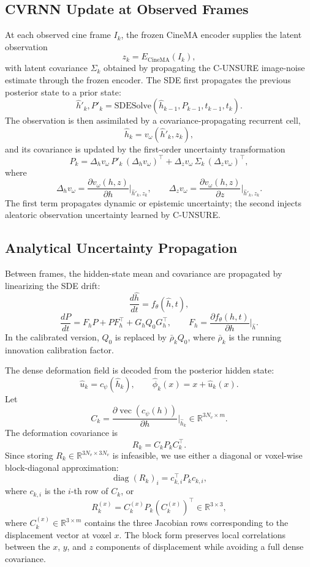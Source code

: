 \subsection{CVRNN Update at Observed Frames}
\label{sec:cvgruu_update_clarified}

At each observed cine frame $I_k$, the frozen CineMA encoder supplies
the latent observation
\[
    z_k = E_{\mathrm{CineMA}}(I_k),
\]
with latent covariance $\Sigma_k$ obtained by propagating the
C-UNSURE image-noise estimate through the frozen encoder. The SDE first
propagates the previous posterior state to a prior state:
\[
    \hat h'_k, P'_k =
    \mathrm{SDESolve}(\hat h_{k-1},P_{k-1},t_{k-1},t_k).
\]
The observation is then assimilated by a covariance-propagating recurrent
cell,
\[
    \hat h_k = v_\omega(\hat h'_k,z_k),
\]
and its covariance is updated by the first-order uncertainty
transformation
\[
    P_k =
    \Delta_h v_\omega\,P'_k\,(\Delta_h v_\omega)^\top
    +
    \Delta_z v_\omega\,\Sigma_k\,(\Delta_z v_\omega)^\top ,
\]
where
\[
    \Delta_h v_\omega =
    \frac{\partial v_\omega(h,z)}{\partial h}
    \bigg|_{\hat h'_k,z_k},
    \qquad
    \Delta_z v_\omega =
    \frac{\partial v_\omega(h,z)}{\partial z}
    \bigg|_{\hat h'_k,z_k}.
\]
The first term propagates dynamic or epistemic uncertainty; the second
injects aleatoric observation uncertainty learned by C-UNSURE.

\subsection{Analytical Uncertainty Propagation}
\label{sec:analytical_uncertainty_clarified}

Between frames, the hidden-state mean and covariance are propagated by
linearizing the SDE drift:
\[
    \frac{d\hat h}{dt}=f_\theta(\hat h,t),
\]
\[
    \frac{dP}{dt}
    =
    F_h P + P F_h^\top
    +
    G_h Q_0 G_h^\top,
    \qquad
    F_h =
    \frac{\partial f_\theta(h,t)}{\partial h}
    \bigg|_{\hat h}.
\]
In the calibrated version, $Q_0$ is replaced by $\bar\rho_k Q_0$, where
$\bar\rho_k$ is the running innovation calibration factor.

The dense deformation field is decoded from the posterior hidden state:
\[
    \widehat u_k = c_\psi(\hat h_k), \qquad
    \widehat\phi_k(x)=x+\widehat u_k(x).
\]
Let
\[
    C_k =
    \frac{\partial \operatorname{vec}(c_\psi(h))}
         {\partial h}
    \bigg|_{\hat h_k}
    \in \mathbb{R}^{3N_v\times m}.
\]
The deformation covariance is
\[
    R_k = C_k P_k C_k^\top .
\]
Since storing $R_k\in\mathbb{R}^{3N_v\times 3N_v}$ is infeasible, we
use either a diagonal or voxel-wise block-diagonal approximation:
\[
    \operatorname{diag}(R_k)_i = c_{k,i}^\top P_k c_{k,i},
\]
where $c_{k,i}$ is the $i$-th row of $C_k$, or
\[
    R_k^{(x)}
    =
    C_k^{(x)}P_k(C_k^{(x)})^\top
    \in\mathbb{R}^{3\times3},
\]
where $C_k^{(x)}\in\mathbb{R}^{3\times m}$ contains the three Jacobian
rows corresponding to the displacement vector at voxel $x$. The block
form preserves local correlations between the $x$, $y$, and $z$
components of displacement while avoiding a full dense covariance.

